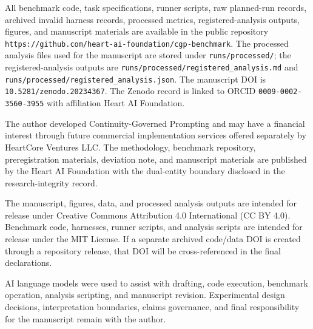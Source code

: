 \documentclass[11pt]{article}
\begin{document}
All benchmark code, task specifications, runner scripts, raw planned-run records, archived invalid harness records, processed metrics, registered-analysis outputs, figures, and manuscript materials are available in the public repository \texttt{https://github.com/heart-ai-foundation/cgp-benchmark}. The processed analysis files used for the manuscript are stored under \texttt{runs/processed/}; the registered-analysis outputs are \texttt{runs/processed/registered\_analysis.md} and \texttt{runs/processed/registered\_analysis.json}. The manuscript DOI is \texttt{10.5281/zenodo.20234367}. The Zenodo record is linked to ORCID \texttt{0009-0002-3560-3955} with affiliation Heart AI Foundation.

The author developed Continuity-Governed Prompting and may have a financial interest through future commercial implementation services offered separately by HeartCore Ventures LLC. The methodology, benchmark repository, preregistration materials, deviation note, and manuscript materials are published by the Heart AI Foundation with the dual-entity boundary disclosed in the research-integrity record.

The manuscript, figures, data, and processed analysis outputs are intended for release under Creative Commons Attribution 4.0 International (CC BY 4.0). Benchmark code, harnesses, runner scripts, and analysis scripts are intended for release under the MIT License. If a separate archived code/data DOI is created through a repository release, that DOI will be cross-referenced in the final declarations.

AI language models were used to assist with drafting, code execution, benchmark operation, analysis scripting, and manuscript revision. Experimental design decisions, interpretation boundaries, claims governance, and final responsibility for the manuscript remain with the author.


\clearpage
\end{document}
